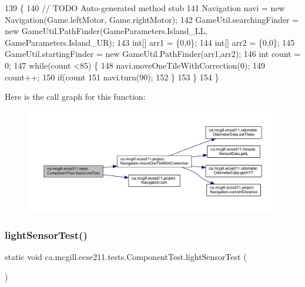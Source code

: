 \begin{DoxyCode}
139                                                                \{
140     \textcolor{comment}{// TODO Auto-generated method stub}
141     Navigation navi = \textcolor{keyword}{new} Navigation(Game.leftMotor, Game.rightMotor);
142     GameUtil.searchingFinder = \textcolor{keyword}{new} GameUtil.PathFinder(GameParameters.Island\_LL, GameParameters.Island\_UR);
143     \textcolor{keywordtype}{int}[] arr1 = \{0,0\};
144     \textcolor{keywordtype}{int}[] arr2 = \{0,0\};
145     GameUtil.startingFinder = \textcolor{keyword}{new} GameUtil.PathFinder(arr1,arr2);
146     \textcolor{keywordtype}{int} count = 0;
147    \textcolor{keywordflow}{while}(count <85) \{
148      navi.moveOneTileWithCorrection(0);
149      count++;
150      \textcolor{keywordflow}{if}(count%
151        navi.turn(90);
152      \}
153    \}
154   \}
\end{DoxyCode}
Here is the call graph for this function\+:\nopagebreak
\begin{figure}[H]
\begin{center}
\leavevmode
\includegraphics[width=350pt]{enumca_1_1mcgill_1_1ecse211_1_1tests_1_1_component_test_a3f36cee9ca567c845377bec33554ba8b_cgraph}
\end{center}
\end{figure}
\mbox{\label{enumca_1_1mcgill_1_1ecse211_1_1tests_1_1_component_test_a3e8288f482b3806a0f3c4668951f3e36}} 
\subsubsection{\texorpdfstring{light\+Sensor\+Test()}{lightSensorTest()}}
{\footnotesize\ttfamily static void ca.\+mcgill.\+ecse211.\+tests.\+Component\+Test.\+light\+Sensor\+Test (\begin{DoxyParamCaption}{ }\end{DoxyParamCaption})\hspace{0.3cm}{\ttfamily [static]}}

